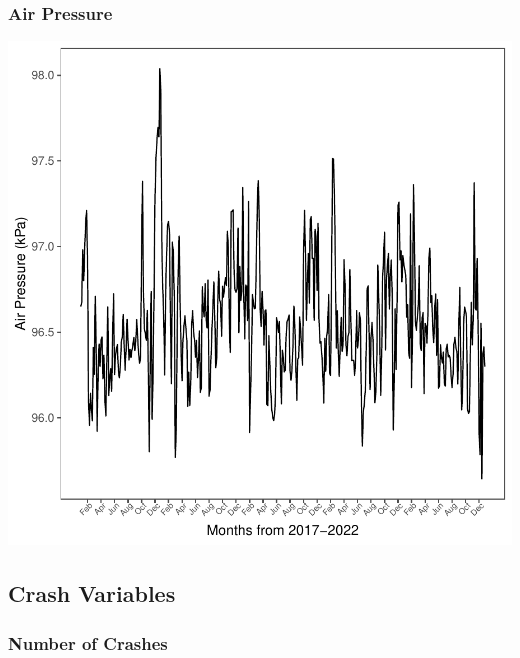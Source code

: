 \documentclass[11pt, a4paper]{article}
\begin{document}
\subsubsection{Air Pressure}

\includegraphics{variableinvestigation-041}




\pagebreak
\subsection{Crash Variables}

\subsubsection{Number of Crashes}
\end{document}
